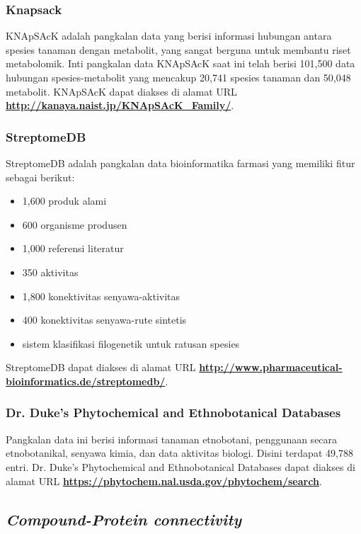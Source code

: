 		\subsubsection{Knapsack} \label{knapsack}
		KNApSAcK adalah pangkalan data yang berisi informasi hubungan antara spesies tanaman dengan metabolit, yang sangat berguna untuk membantu riset metabolomik. Inti pangkalan data KNApSAcK saat ini telah berisi 101,500 data hubungan spesies-metabolit yang mencakup 20,741 spesies tanaman dan 50,048 metabolit. KNApSAcK dapat diakses di alamat URL \textbf{\url{http://kanaya.naist.jp/KNApSAcK_Family/}}.

		\subsubsection{StreptomeDB} \label{streptome_db}
		StreptomeDB adalah pangkalan data bioinformatika farmasi yang memiliki fitur sebagai berikut:
		\begin{itemize}
		\item 1,600 produk alami
		\item 600 organisme produsen
		\item 1,000 referensi literatur
		\item 350 aktivitas
		\item 1,800 konektivitas senyawa-aktivitas
		\item 400 konektivitas senyawa-rute sintetis 
		\item sistem klasifikasi filogenetik untuk ratusan spesies
		\end{itemize}
		StreptomeDB dapat diakses di alamat URL \textbf{\url{http://www.pharmaceutical-bioinformatics.de/streptomedb/}}.

		\subsubsection{Dr. Duke's Phytochemical and Ethnobotanical Databases} \label{pedb}
		Pangkalan data ini berisi informasi tanaman etnobotani, penggunaan secara etnobotanikal, senyawa kimia, dan data aktivitas biologi. Disini terdapat 49,788 entri. Dr. Duke's Phytochemical and Ethnobotanical Databases dapat diakses di alamat URL \textbf{\url{https://phytochem.nal.usda.gov/phytochem/search}}.

	\subsection{\emph{Compound-Protein connectivity}}
